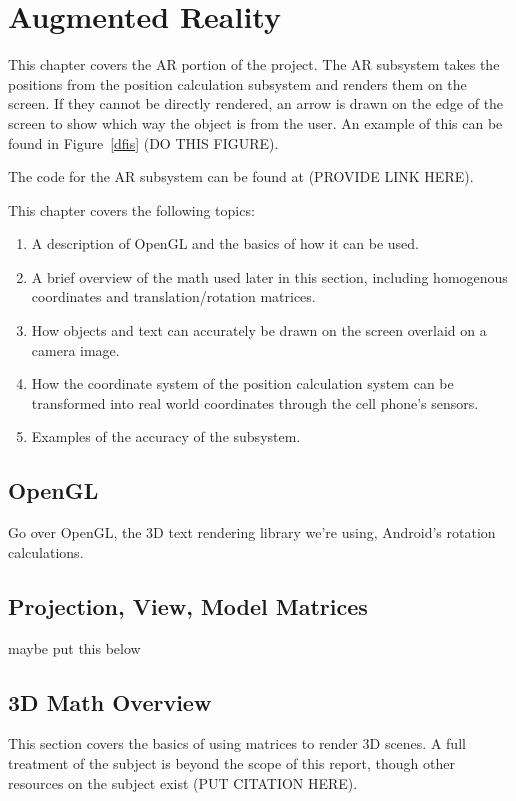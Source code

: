 
\chapter{Augmented Reality} %

\label{AugmentedReality}


This chapter covers the AR portion of the project. The AR subsystem takes the positions from the position calculation subsystem and renders them on the screen. If they cannot be directly rendered, an arrow is drawn on the edge of the screen to show which way the object is from the user. An example of this can be found in Figure~\ref{dfis} (DO THIS FIGURE).

The code for the AR subsystem can be found at (PROVIDE LINK HERE).

This chapter covers the following topics:
\begin{enumerate}
	\item A description of OpenGL and the basics of how it can be used. 
	\item A brief overview of the math used later in this section, including homogenous coordinates and translation/rotation matrices.
	\item How objects and text can accurately be drawn on the screen overlaid on a camera image.
	\item How the coordinate system of the position calculation system can be transformed into real world coordinates through the cell phone's sensors.
	\item Examples of the accuracy of the subsystem.
\end{enumerate}

\section{OpenGL}
Go over OpenGL, the 3D text rendering library we're using, Android's rotation calculations.

\section{Projection, View, Model Matrices}
maybe put this below

\section{3D Math Overview}
This section covers the basics of using matrices to render 3D scenes. A full treatment of the subject is beyond the scope of this report, though other resources on the subject exist (PUT CITATION HERE).

